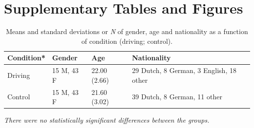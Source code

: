 \documentclass[authordate, empirical, issue]{jote-new-article}
\begin{document}










\clearpage
\onecolumn

\section{Supplementary Tables and Figures}




\begin{table}[h]
  \caption{Means and standard deviations or \emph{N} of gender, age and nationality as a function of condition (driving; control).}
  \label{tab:s1}
  \begin{tabularx}{\textwidth}{@{} l l l X  @{}}

    \toprule
    \textbf{Condition*} &
    \textbf{Gender}     & \textbf{Age} &

    \textbf{Nationality }                                                                       \\
    \midrule

    Driving             & 15 M, 43 F   & 22.00 (2.66) & 29 Dutch, 8 German, 3 English, 18 other
    \\
    Control             & 15 M, 43 F   & 21.60 (3.02) & 39 Dutch, 8 German, 11 other
    \\
    \bottomrule
  \end{tabularx}
  \emph{\small  *There were no statistically significant differences between the groups.}
\end{table}
\end{document}
